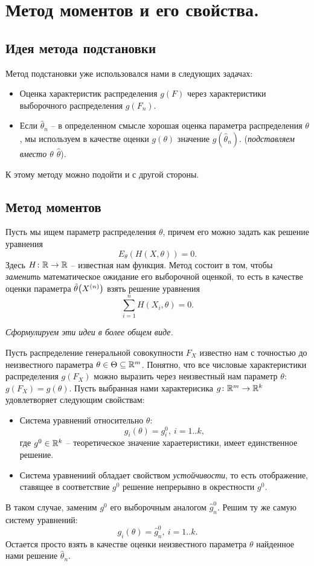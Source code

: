 \section{Метод моментов и его свойства.}

\subsection{Идея метода подстановки}
Метод подстановки уже использовался нами в следующих задачах:
\begin{itemize}
    \item Оценка характеристик распределения $g(F)$ через характеристики 
        выборочного распределения $g(F_n)$.
    \item Если $\hat{\theta}_n$ -- в определенном смысле хорошая оценка
        параметра распределения $\theta$, мы используем в качестве оценки
        $g(\theta)$ значение $g(\hat{\theta}_n)$. (\textit{подставляем
        вместо $\theta$ $\hat{\theta}$}).
\end{itemize}

К этому методу можно подойти и с другой стороны.

\subsection{Метод моментов}
Пусть мы ищем параметр распределения $\theta$, причем его можно задать как 
решение уравнения
\[
    E_\theta(H(X, \theta)) = 0
.\]
Здесь $H \colon \mathbb{R} \to \mathbb{R}$ -- известная нам функция. Метод состоит в том,
чтобы \textit{заменить} математическое ожидание его выборочной оценкой, 
то есть в качестве оценки параметра $\hat{\theta}\parens*{X^{(n)}}$ взять
решение уравнения
\[
    \sum_{i = 1}^n{H(X_i, \theta)} = 0
.\]

\textit{Сформулируем эти идеи в более общем виде.}

Пусть распределение генеральной совокупности $F_X$ известно нам с точностью до
неизвестного параметра $\theta \in \Theta \subseteq \mathbb{R}^m$. Понятно, что все числовые 
характеристики распределения $g(F_X)$ можно выразить через неизвестный нам
параметр $\theta$: $g(F_X) = g(\theta)$. Пусть выбранная нами характерисика
$g \colon \mathbb{R}^m \to \mathbb{R}^k$ удовлетворяет следующим свойствам:
\begin{itemize}
    \item Система уравнений относительно $\theta$:
        \[
            g_i(\theta) = g^0_i,~ i = 1..k
        ,\]
        где $g^0 \in \mathbb{R}^k$ -- теоретическое значение хараетеристики,
        имеет единственное решение.
    \item Система уравнениий обладает свойством \textit{устойчивости}, то есть 
        отображение, ставящее в соответствие $g^0$ решение непрерывно в
        окрестности $g^0$.
\end{itemize}
В таком случае, заменим $g^0$ его выборочным аналогом $\hat{g}^0_n$. Решим
ту же самую систему уравнений:
\[
    g_i(\theta) = \hat{g}^0_n,~ i = 1..k
.\]
Остается просто взять в качестве оценки неизвестного параметра $\theta$
найденное нами решение $\hat{\theta}_n$.

